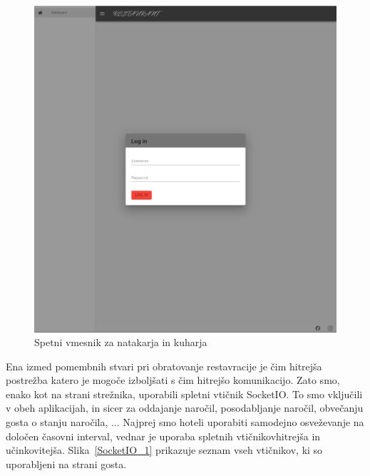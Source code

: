 \documentclass[a4paper, 12pt]{book}
\begin{document}
\begin{figure}[!htb]
\begin{center}
\includegraphics[width=12cm]{natakar-gost_1.jpg}
\caption{Spetni vmesnik za natakarja in kuharja}
\label{NatakarGost}
\end{center}
\end{figure}


Ena izmed pomembnih stvari pri obratovanje restavracije je čim hitrejša postrežba katero je mogoče izboljšati s čim hitrejšo komunikacijo. Zato smo, enako kot na strani strežnika, uporabili spletni vtičnik SocketIO. To smo vključili v obeh aplikacijah, in sicer za oddajanje naročil, posodabljanje naročil, obvečanju gosta o stanju naročila, ... Najprej smo hoteli uporabiti samodejno osveževanje na določen časovni interval, vednar je uporaba spletnih vtičnikovhitrejša in učinkovitejša. Slika~\ref{SocketIO_1} prikazuje seznam vseh vtičnikov, ki so uporabljeni na strani gosta.
\end{document}

